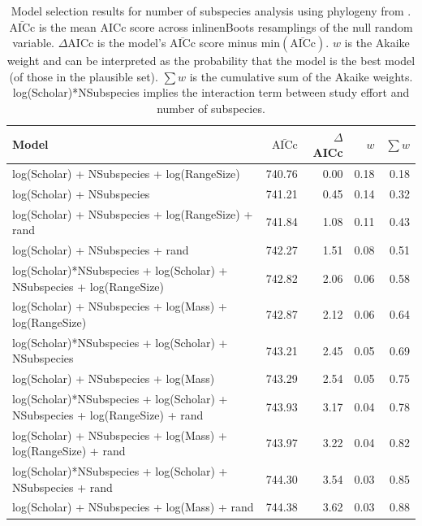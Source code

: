 \begin{table}[ht]
\centering
\caption[
  Full model selection results for number of subspecies analysis. 
]{
  Model selection results for number of subspecies analysis using phylogeny from \cite{jones2005bats}. 
  $\bar{\text{AICc}}$ is the mean AICc score across 
inline{nBoots} resamplings of the null random variable. 
  $\Delta$AICc is the model's $\bar{\text{AICc}}$ score minus $\text{min}(\bar{\text{AICc}})$. 
  $w$ is the Akaike weight and can be interpreted as the probability that the model is the best model (of those in the plausible set).
  $\sum w$ is the cumulative sum of the Akaike weights.
  log(Scholar)*NSubspecies implies the interaction term between study effort and number of subspecies.
  } 
\label{A-modelWeights2}
\begingroup\tiny
\begin{tabular}{@{}lrrrr@{}}
  \toprule
Model & $\bar{\text{AICc}}$ & $\Delta$AICc & $w$ & $\sum w$ \\ 
  \midrule
log(Scholar) + NSubspecies + log(RangeSize) & 740.76 & 0.00 & 0.18 & 0.18 \\ 
  log(Scholar) + NSubspecies & 741.21 & 0.45 & 0.14 & 0.32 \\ 
  log(Scholar) + NSubspecies + log(RangeSize) + rand & 741.84 & 1.08 & 0.11 & 0.43 \\ 
  log(Scholar) + NSubspecies + rand & 742.27 & 1.51 & 0.08 & 0.51 \\ 
  log(Scholar)*NSubspecies + log(Scholar) + NSubspecies + log(RangeSize) & 742.82 & 2.06 & 0.06 & 0.58 \\ 
  log(Scholar) + NSubspecies + log(Mass) + log(RangeSize) & 742.87 & 2.12 & 0.06 & 0.64 \\ 
  log(Scholar)*NSubspecies + log(Scholar) + NSubspecies & 743.21 & 2.45 & 0.05 & 0.69 \\ 
  log(Scholar) + NSubspecies + log(Mass) & 743.29 & 2.54 & 0.05 & 0.75 \\ 
  log(Scholar)*NSubspecies + log(Scholar) + NSubspecies + log(RangeSize) + rand & 743.93 & 3.17 & 0.04 & 0.78 \\ 
  log(Scholar) + NSubspecies + log(Mass) + log(RangeSize) + rand & 743.97 & 3.22 & 0.04 & 0.82 \\ 
  log(Scholar)*NSubspecies + log(Scholar) + NSubspecies + rand & 744.30 & 3.54 & 0.03 & 0.85 \\ 
  log(Scholar) + NSubspecies + log(Mass) + rand & 744.38 & 3.62 & 0.03 & 0.88 \\ 

\end{tabular}
\end{table}
